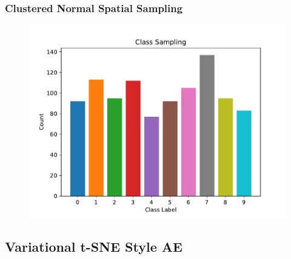 \documentclass[10pt, usenames, dvipsnames, table]{beamer}
\begin{document}
\begin{frame}
  \frametitle{Clustered Normal Spatial Sampling}
  \begin{figure}
    \centering
    \includegraphics[width=\linewidth]
    {models/mnist_student_e300_L2_b64/multi-normal-cluster_sampling_distribution_1000}
    \caption{}
    \label{}
  \end{figure}
\end{frame}

\subsection{Variational t-SNE Style AE}
\end{document}
